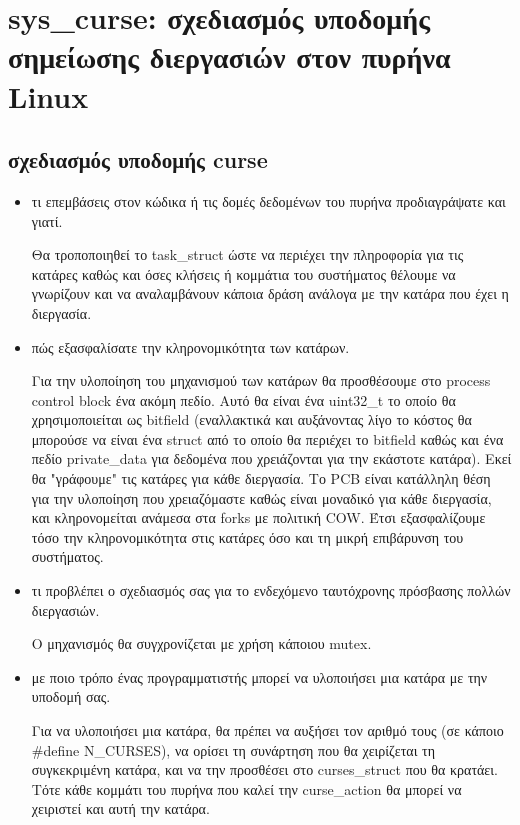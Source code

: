 \documentclass[a4paper,11pt]{article} \usepackage{anysize}
\begin{document}
\renewcommand{\theenumi}{\roman{enumi}}


\section*{sys\_curse: σχεδιασμός υποδομής σημείωσης διεργασιών στον πυρήνα Linux}
\subsection*{σχεδιασμός υποδομής curse}
\begin{itemize}
    \item τι επεμβάσεις στον κώδικα ή τις δομές δεδομένων του πυρήνα προδιαγράψατε και γιατί.

        Θα τροποποιηθεί το task\_struct ώστε να περιέχει την πληροφορία για
        τις κατάρες καθώς και όσες κλήσεις ή κομμάτια του συστήματος θέλουμε
        να γνωρίζουν και να αναλαμβάνουν κάποια δράση ανάλογα με την κατάρα
        που έχει η διεργασία.

    \item πώς εξασφαλίσατε την κληρονομικότητα των κατάρων.

        Για την υλοποίηση του μηχανισμού των κατάρων θα προσθέσουμε στο
        process control block ένα ακόμη πεδίο. Αυτό θα είναι ένα uint32\_t το
        οποίο θα χρησιμοποιείται ως bitfield (εναλλακτικά και αυξάνοντας λίγο
        το κόστος θα μπορούσε να είναι ένα struct από το οποίο θα περιέχει το
        bitfield καθώς και ένα πεδίο private\_data για δεδομένα που
        χρειάζονται για την εκάστοτε κατάρα). Εκεί θα "γράφουμε" τις κατάρες
        για κάθε διεργασία. Το PCB είναι κατάλληλη θέση για την υλοποίηση που
        χρειαζόμαστε καθώς είναι μοναδικό για κάθε διεργασία, και
        κληρονομείται ανάμεσα στα forks με πολιτική COW. Έτσι εξασφαλίζουμε
        τόσο την κληρονομικότητα στις κατάρες όσο και τη μικρή επιβάρυνση του
        συστήματος.

    \item τι προβλέπει ο σχεδιασμός σας για το ενδεχόμενο ταυτόχρονης πρόσβασης πολλών διεργασιών.

        Ο μηχανισμός θα συγχρονίζεται με χρήση κάποιου mutex.

    \item με ποιο τρόπο ένας προγραμματιστής μπορεί να υλοποιήσει μια κατάρα με την υποδομή σας.

        Για να υλοποιήσει μια κατάρα, θα πρέπει να αυξήσει τον αριθμό τους
        (σε κάποιο \#define N\_CURSES), να ορίσει τη συνάρτηση που θα χειρίζεται
        τη συγκεκριμένη κατάρα, και να την προσθέσει στο curses\_struct που θα
        κρατάει. Τότε κάθε κομμάτι του πυρήνα που καλεί την curse\_action θα
        μπορεί να χειριστεί και αυτή την κατάρα. 


\end{itemize}
\end{document}
